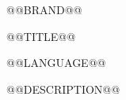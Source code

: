 \documentclass[UTF8,fontset=fandol,scheme=plain,11pt,oneside]{ctexrep}
\renewcommand{\_}{\textunderscore\allowbreak}
\begin{document}
\begin{titlepage}
\vspace*{25mm}
@@BRAND@@
\vspace{12mm}
{\LARGE @@TITLE@@\par}
\vspace{8mm}
{\large @@LANGUAGE@@\par}
\vfill
@@DESCRIPTION@@
\end{titlepage}
\tableofcontents
\clearpage
{}

\end{document}
